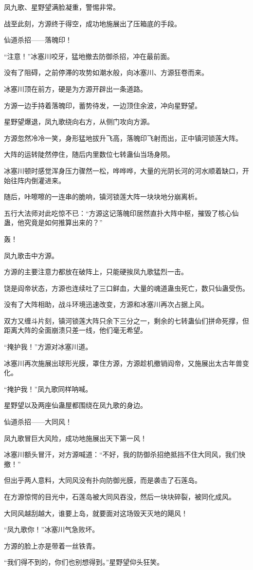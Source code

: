 \begin{this_body}
凤九歌、星野望满脸凝重，警惕非常。

战至此刻，方源终于得空，成功地施展出了压箱底的手段。

仙道杀招——落魄印！

“注意！”冰塞川咬牙，猛地撤去防御杀招，冲在最前面。

没有了阻碍，之前停滞的攻势如潮水般，向冰塞川、方源狂卷而来。

冰塞川顶在前方，硬是为方源开辟出一条道路。

方源一边手持着落魄印，蓄势待发，一边顶住余波，冲向星野望。

星野望爆退，凤九歌绕向右方，从侧门攻向方源。

方源忽然冷冷一笑，身形猛地拔升飞高，落魄印飞射而出，正中镇河锁莲大阵。

大阵的运转陡然停住，随后内里数位七转蛊仙当场身陨。

冰塞川顿时感觉浑身压力骤然一松，哗哗哗，大量的光阴长河的河水顺着缺口，开始往阵内倒灌进来。

随后，咔嚓嚓的一连串的脆响，镇河锁莲大阵一块块地分崩离析。

五行大法师对此吃惊不已：“方源这记落魄印居然直扑大阵中枢，摧毁了核心仙蛊，他究竟是如何推算出来的？”

轰！

凤九歌击中方源。

方源的主要注意力都放在破阵上，只能硬挨凤九歌猛烈一击。

饶是阎帝状态，方源也连续吐了三口鲜血，大量的魂道蛊虫死亡，数只仙蛊受伤。

没有了大阵相助，战斗环境迅速改变，方源和冰塞川再次占据上风。

双方又缠斗片刻，镇河锁莲大阵只余下三分之一，剩余的七转蛊仙们拼命死撑，但距离大阵的全面崩溃只差一线，他们毫无希望。

“掩护我！”方源对冰塞川道。

冰塞川再次施展出球形光膜，罩住方源，方源趁机撤销阎帝，又施展出太古年兽变化。

“掩护我！”凤九歌同样呐喊。

星野望以及两座仙蛊屋都围绕在凤九歌的身边。

仙道杀招——大同风！

凤九歌冒巨大风险，成功地施展出天下第一风！

冰塞川额头冒汗，对方源喊道：“不好，我的防御杀招绝抵挡不住大同风，我们快撤！”

但出乎两人意料，大同风没有扑向防御光膜，而是袭击了石莲岛。

在方源惊愕的目光中，石莲岛被大同风吞没，然后一块块碎裂，被同化成风。

大同风越刮越大，谁要上岛，就要面对这场毁天灭地的飓风！

“凤九歌你！”冰塞川气急败坏。

方源的脸上亦是带着一丝铁青。

“我们得不到的，你们也别想得到。”星野望仰头狂笑。

\end{this_body}


